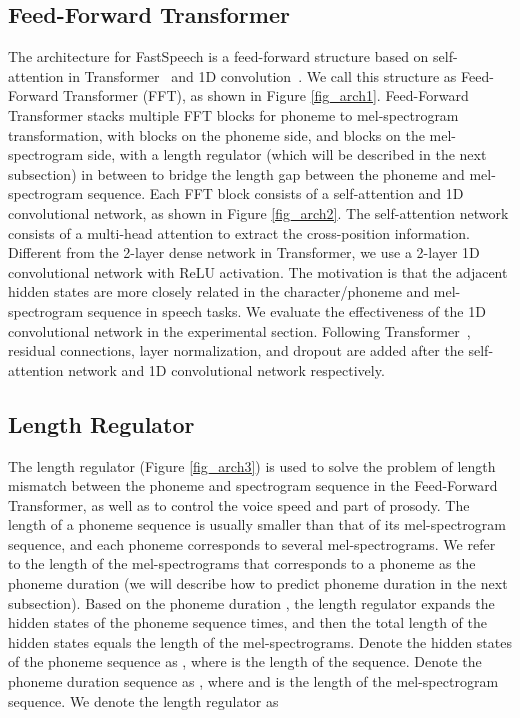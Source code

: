 \documentclass{article}
\begin{document}
\subsection{Feed-Forward Transformer}
\label{sec_fft}
The architecture for FastSpeech is a feed-forward structure based on self-attention in Transformer~\citep{vaswani2017attention} and 1D convolution~\citep{gehring2017convolutional,ping2018deep}. We call this structure as Feed-Forward Transformer (FFT), as shown in Figure \ref{fig_arch1}. Feed-Forward Transformer stacks multiple FFT blocks for phoneme to mel-spectrogram transformation, with  blocks on the phoneme side, and  blocks on the mel-spectrogram side, with a length regulator (which will be described in the next subsection) in between to bridge the length gap between the phoneme and mel-spectrogram sequence.
Each FFT block consists of a self-attention and 1D convolutional network, as shown in Figure \ref{fig_arch2}. The self-attention network consists of a multi-head attention to extract the cross-position information. Different from the 2-layer dense network in Transformer, we use a 2-layer 1D convolutional network with ReLU activation. The motivation is that the adjacent hidden states are more closely related in the character/phoneme and mel-spectrogram sequence in speech tasks. We evaluate the effectiveness of the 1D convolutional network in the experimental section. Following Transformer~\citep{vaswani2017attention}, residual connections, layer normalization, and dropout are added after the self-attention network and 1D convolutional network respectively. 

\subsection{Length Regulator}
\label{sec_la}

The length regulator (Figure \ref{fig_arch3}) is used to solve the problem of length mismatch between the phoneme and spectrogram sequence in the Feed-Forward Transformer, as well as to control the voice speed and part of prosody. The length of a phoneme sequence is usually smaller than that of its mel-spectrogram sequence, and each phoneme corresponds to several mel-spectrograms. We refer to the length of the mel-spectrograms that corresponds to a phoneme as the phoneme duration (we will describe how to predict phoneme duration in the next subsection). Based on the phoneme duration , the length regulator expands the hidden states of the phoneme sequence  times, and then the total length of the hidden states equals the length of the mel-spectrograms. Denote the hidden states of the phoneme sequence as , where  is the length of the sequence. Denote the phoneme duration sequence as , where  and  is the length of the mel-spectrogram sequence. We denote the length regulator  as 
\end{document}

